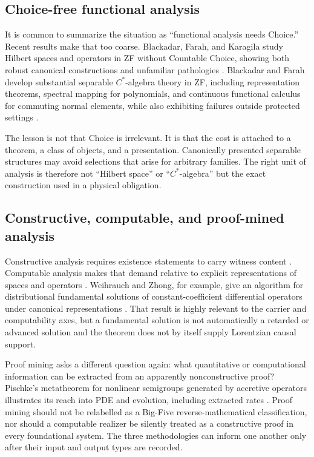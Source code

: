 \documentclass[11pt]{article}
\theoremstyle{definition}
\theoremstyle{remark}
\begin{document}
\subsection{Choice-free functional analysis}

It is common to summarize the situation as ``functional analysis needs
Choice.''  Recent results make that too coarse.  Blackadar, Farah, and
Karagila study Hilbert spaces and operators in ZF without Countable Choice,
showing both robust canonical constructions and unfamiliar pathologies
\cite{BlackadarFarahKaragila2023}.  Blackadar and Farah develop substantial
separable \(C^*\)-algebra theory in ZF, including representation theorems,
spectral mapping for polynomials, and continuous functional calculus for
commuting normal elements, while also exhibiting failures outside protected
settings \cite{BlackadarFarah2026}.

The lesson is not that Choice is irrelevant.  It is that the cost is attached
to a theorem, a class of objects, and a presentation.  Canonically presented
separable structures may avoid selections that arise for arbitrary families.
The right unit of analysis is therefore not ``Hilbert space'' or
``\(C^*\)-algebra'' but the exact construction used in a physical obligation.

\subsection{Constructive, computable, and proof-mined analysis}

Constructive analysis requires existence statements to carry witness content
\cite{BishopBridges1985}.  Computable analysis makes that demand relative to
explicit representations of spaces and operators \cite{Weihrauch2000}.
Weihrauch and Zhong, for example, give an algorithm for distributional
fundamental solutions of constant-coefficient differential operators under
canonical representations \cite{WeihrauchZhong2006}.  That result is highly
relevant to the carrier and computability axes, but a fundamental solution is
not automatically a retarded or advanced solution and the theorem does not by
itself supply Lorentzian causal support.

Proof mining asks a different question again: what quantitative or
computational information can be extracted from an apparently nonconstructive
proof?  Pischke's metatheorem for nonlinear semigroups generated by accretive
operators illustrates its reach into PDE and evolution, including extracted
rates \cite{Pischke2025}.  Proof mining should not be relabelled as a Big-Five
reverse-mathematical classification, nor should a computable realizer be
silently treated as a constructive proof in every foundational system.  The
three methodologies can inform one another only after their input and output
types are recorded.
\end{document}
